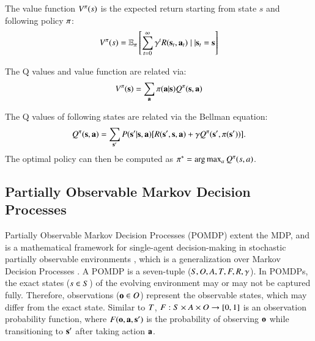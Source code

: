 The value function $V^\pi(s)$ is the expected return starting from state $s$ and following policy $\pi$: 
\begin{equation}
V^\pi(s) = \mathbb{E}_\pi\left[\sum_{t=0}^\infty \gamma^t R(\mathbf{s}_t,\mathbf{a}_t)\mid | \mathbf{s}_t = \mathbf{s} \right  ]
\end{equation} 

The Q values and value function are related via: 
\begin{equation}
V^\pi(\mathbf{s}) = \sum_{\mathbf{a}} \pi(\mathbf{a}|\mathbf{s}) Q^\pi(\mathbf{s},\mathbf{a})
\end{equation}

The Q values of following states are related via the Bellman equation:
\begin{equation}
\label{eq:bellman}
    Q^\pi(\mathbf{s}, \mathbf{a}) = \sum_{\mathbf{s}'} P(\mathbf{s}'|\mathbf{s},\mathbf{a})[R(\mathbf{s}',\mathbf{s},\mathbf{a}) + \gamma Q^\pi(\mathbf{s}',\pi(\mathbf{s}'))].
\end{equation}
The optimal policy can then be computed as $\pi^* = \arg\max_a Q^\pi(s,a)$.
 
\subsection{Partially Observable Markov Decision Processes}
\label{sec:back:pomdp}

Partially Observable Markov Decision Processes (POMDP)  extent the MDP, and is a mathematical framework for single-agent decision-making in stochastic partially observable environments \cite{aastrom1965optimal}, which is a generalization over Markov Decision Processes \cite{howard1960dynamic}. A POMDP is a seven-tuple ($S, O, A, T, {F}, R, \gamma$). In POMDPs, the exact states ($s \in S$) of the evolving environment may or may not be captured fully. Therefore, observations ($\mathbf{o} \in O$) represent the observable states, which may differ from the exact state. Similar to $T$, ${F}: S \times A \times O \rightarrow [0,1]$ is an observation probability function, where ${F} (\mathbf{o}, \mathbf{a}, \mathbf{s}')$ is the probability of observing $\mathbf{o}$ while transitioning to $\mathbf{s}'$ after taking action $\mathbf{a}$. 

